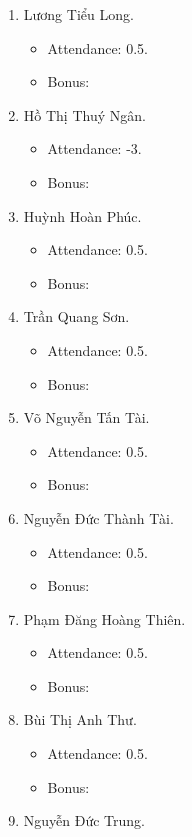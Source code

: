 \documentclass{article}
\begin{document}
\begin{enumerate}
    \item {\sc Lương Tiểu Long.}
    \begin{itemize}
        \item Attendance: 0.5.
        \item Bonus:
    \end{itemize}
    \item {\sc Hồ Thị Thuý Ngân.}
    \begin{itemize}
        \item Attendance: -3.
        \item Bonus:
    \end{itemize}
    \item {\sc Huỳnh Hoàn Phúc.}
    \begin{itemize}
        \item Attendance: 0.5.
        \item Bonus:
    \end{itemize}
    \item {\sc Trần Quang Sơn.}
    \begin{itemize}
        \item Attendance: 0.5.
        \item Bonus:
    \end{itemize}
    \item {\sc Võ Nguyễn Tấn Tài.}
    \begin{itemize}
        \item Attendance: 0.5.
        \item Bonus:
    \end{itemize}
    \item {\sc Nguyễn Đức Thành Tài.}
    \begin{itemize}
        \item Attendance: 0.5.
        \item Bonus:
    \end{itemize}
    \item {\sc Phạm Đăng Hoàng Thiên.}
    \begin{itemize}
        \item Attendance: 0.5.
        \item Bonus:
    \end{itemize}
    \item {\sc Bùi Thị Anh Thư.}
    \begin{itemize}
        \item Attendance: 0.5.
        \item Bonus:
    \end{itemize}
    \item {\sc Nguyễn Đức Trung.}

\end{enumerate}
\end{document}
